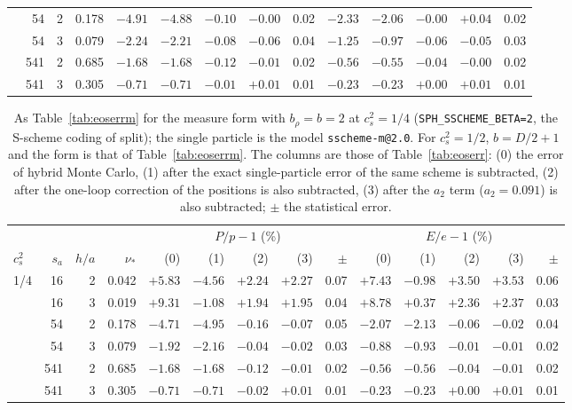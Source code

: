 \documentclass[11pt,aps,preprint,nofootinbib,superscriptaddress,tightenlines]{revtex4-2}
\def\Tab#1{Table~\ref{#1}}
\begin{document}
\begin{table}[h]
\begin{center}
\begin{tabular}{lrrr|rrrrr|rrrrr}
 & 54 & 2 & 0.178 & $-4.91$ & $-4.88$ & $-0.10$ & $-0.00$ & 0.02 & $-2.33$ & $-2.06$ & $-0.00$ & $+0.04$ & 0.02 \\
 & 54 & 3 & 0.079 & $-2.24$ & $-2.21$ & $-0.08$ & $-0.06$ & 0.04 & $-1.25$ & $-0.97$ & $-0.06$ & $-0.05$ & 0.03 \\
 & 541 & 2 & 0.685 & $-1.68$ & $-1.68$ & $-0.12$ & $-0.01$ & 0.02 & $-0.56$ & $-0.55$ & $-0.04$ & $-0.00$ & 0.02 \\
 & 541 & 3 & 0.305 & $-0.71$ & $-0.71$ & $-0.01$ & $+0.01$ & 0.01 & $-0.23$ & $-0.23$ & $+0.00$ & $+0.01$ & 0.01 \\
\bottomrule
\end{tabular}
\end{center}
\end{table}
\begin{table}[h]
\caption{As \Tab{tab:eoserrm} for the measure form with $b_\rho=b=2$ at $c_s^2=1/4$ (\texttt{SPH\_SSCHEME\_BETA=2}, the S-scheme coding of split); the single particle is the model \texttt{sscheme-m@2.0}.  For $c_s^2=1/2$, $b=D/2+1$ and the form is that of \Tab{tab:eoserrm}. The columns are those of \Tab{tab:eoserr}: (0) the error of hybrid Monte Carlo, (1) after the exact single-particle error of
the same scheme is subtracted, (2) after the one-loop correction of the positions is also subtracted, (3) after the $a_2$ term ($a_2=0.091$) is also
subtracted; $\pm$ the statistical error.}
\label{tab:eoserrb}
\begin{center}\small
\begin{tabular}{lrrr|rrrrr|rrrrr}
\toprule
 & & & & \multicolumn{5}{c|}{$P/p-1$ (\%)} & \multicolumn{5}{c}{$E/e-1$ (\%)} \\
$c_s^2$ & $s_a$ & $h/a$ & $\nu_*$ & (0) & (1) & (2) & (3) & $\pm$ & (0) & (1) & (2) & (3) & $\pm$ \\
\midrule
1/4 & 16 & 2 & 0.042 & $+5.83$ & $-4.56$ & $+2.24$ & $+2.27$ & 0.07 & $+7.43$ & $-0.98$ & $+3.50$ & $+3.53$ & 0.06 \\
 & 16 & 3 & 0.019 & $+9.31$ & $-1.08$ & $+1.94$ & $+1.95$ & 0.04 & $+8.78$ & $+0.37$ & $+2.36$ & $+2.37$ & 0.03 \\
 & 54 & 2 & 0.178 & $-4.71$ & $-4.95$ & $-0.16$ & $-0.07$ & 0.05 & $-2.07$ & $-2.13$ & $-0.06$ & $-0.02$ & 0.04 \\
 & 54 & 3 & 0.079 & $-1.92$ & $-2.16$ & $-0.04$ & $-0.02$ & 0.03 & $-0.88$ & $-0.93$ & $-0.01$ & $-0.01$ & 0.02 \\
 & 541 & 2 & 0.685 & $-1.68$ & $-1.68$ & $-0.12$ & $-0.01$ & 0.02 & $-0.56$ & $-0.56$ & $-0.04$ & $-0.01$ & 0.02 \\
 & 541 & 3 & 0.305 & $-0.71$ & $-0.71$ & $-0.02$ & $+0.01$ & 0.01 & $-0.23$ & $-0.23$ & $+0.00$ & $+0.01$ & 0.01 \\
\bottomrule
\end{tabular}
\end{center}
\end{table}
\end{document}
